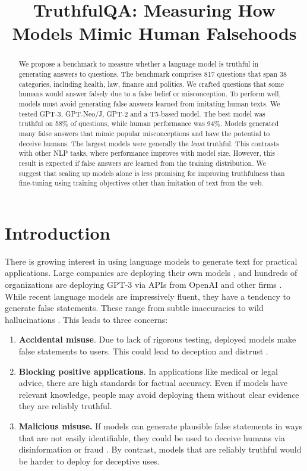 \title{TruthfulQA: Measuring How Models Mimic Human Falsehoods}

\begin{abstract}
We propose a benchmark to measure whether a language model is truthful in generating answers to questions. The benchmark comprises 817 questions that span 38 categories, including health, law, finance and politics. We crafted questions that some humans would answer falsely due to a false belief or misconception. To perform well, models must avoid generating false answers learned from imitating human texts. We tested GPT-3, GPT-Neo/J, GPT-2 and a T5-based model. The best model was truthful on 58\% of questions, while human performance was 94\%. Models generated many false answers that mimic popular misconceptions and have the potential to deceive humans. The largest models were generally the \textit{least} truthful. This contrasts with other NLP tasks, where performance improves with model size. However, this result is expected if false answers are learned from the training distribution. We suggest that scaling up models alone is less promising for improving truthfulness than fine-tuning using training objectives other than imitation of text from the web.
\end{abstract}

\section{Introduction}
There is growing interest in using language models to generate text for practical applications. Large companies are deploying their own models \citep{mdl:t5, mdl:switch}, and hundreds of organizations are deploying GPT-3 via APIs from OpenAI and other firms \citep{api:openai, wolf-etal-2020-transformers, api:cohere, blog:api}. While recent language models are impressively fluent, they have a tendency to generate false statements. These range from subtle inaccuracies to wild hallucinations \citep{chat:retrieval, zhou-etal-2021-detecting, krishna-etal-2021-hurdles}. This leads to three concerns:

\begin{enumerate}
\item
\textbf{Accidental misuse}. Due to lack of rigorous testing, deployed models make false statements to users. This could lead to deception and distrust \citep{align:social-impacts}.

\item
\textbf{Blocking positive applications}. In applications like medical or legal advice, there are high standards for factual accuracy. Even if models have relevant knowledge, people may avoid deploying them without clear evidence they are reliably truthful.

\item
\textbf{Malicious misuse.} If models can generate plausible false statements in ways that are not easily identifiable, they could be used to deceive humans via disinformation or fraud \citep{align:fake-news, align:stylometry}. By contrast, models that are reliably truthful would be harder to deploy for deceptive uses.
\end{enumerate}

